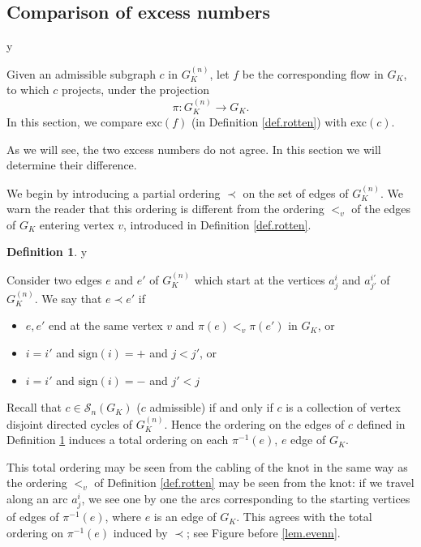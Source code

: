 \documentclass{amsart}
\theoremstyle{plain}
\theoremstyle{definition}
\newtheorem{definition}[proposition]{Definition}
\theoremstyle{remark}
\def\printname#1{
        \if\draft y
                \smash{\makebox[0pt]{\hspace{-0.5in}
                        \raisebox{8pt}{\tt\tiny #1}}}
        \fi
}
\def\lbl#1{\label{#1}\printname{#1}}
\def\Sev{{\mathcal S}}
\def\sign{\mathrm{sign}}
\def\exc{\mathrm{exc}}
\begin{document}
\subsection{Comparison of excess numbers}
\lbl{sub.coexcess}

Given an admissible subgraph $c$ in $G_K^{(n)}$, let $f$ be the 
corresponding flow in $G_K$, to which $c$ projects, under the projection
$$
\pi: G_K^{(n)} \to G_K.
$$ 
In this section, we 
compare $\exc(f)$ (in Definition \ref{def.rotten}) with
$\exc(c)$.

As we will see, the two excess numbers do not agree. In this section
we will determine their difference.

We begin by introducing a partial ordering $\prec$ on the set of edges
of $G_K^{(n)}$. We warn the reader that this ordering is different 
from the ordering $<_v$ of the edges of $G_K$ entering vertex $v$,
introduced in Definition \ref{def.rotten}.

\begin{definition}
\lbl{def.orderf}
Consider two edges $e$ and $e'$ of $G_K^{(n)}$ which start at the vertices
$a^i_j$ and $a^{i'}_{j'}$  of $G_K^{(n)}$. We say that
$e \prec e'$ if
\begin{itemize}
\item
$e,e'$ end at the same vertex $v$ and $\pi(e) <_v \pi(e')$ in $G_K$, or
\item
$i=i'$ and $\sign(i)=+$ and $j < j'$, or
\item
$i=i'$ and $\sign(i)=-$ and $j' < j$
\end{itemize}
\end{definition}

Recall that $c\in \Sev_n(G_K)$ ($c$ admissible) if and only if
 $c$ is a collection of vertex disjoint directed cycles of $G_K^{(n)}$.
Hence the ordering on the edges of $c$ defined in Definition \ref{def.orderf}
induces a total ordering on each $\pi^{-1}(e)$, $e$  edge of $G_K$.

This total ordering may be seen from the cabling of the knot in the same way 
as the ordering $<_v$ of Definition \ref{def.rotten} may be seen from the knot:
if we travel along an arc $a^i_j$, we see one by one the arcs corresponding
to the starting vertices of edges of $\pi^{-1}(e)$, where $e$ is an edge of 
$G_K$.
This agrees with the total ordering on $\pi^{-1}(e)$ induced by $\prec$;
see Figure before \ref{lem.evenn}.
\end{document}
